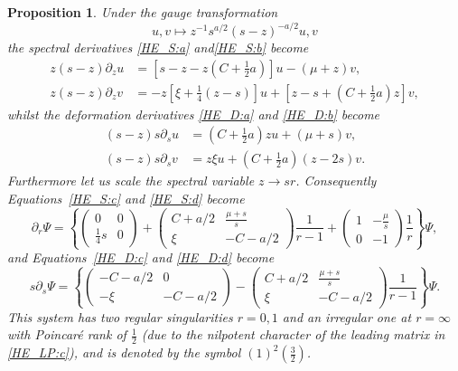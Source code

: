 \documentclass[10pt,reqno]{amsart}
\theoremstyle{plain}
\newtheorem{proposition}{Proposition}
\theoremstyle{definition}
\theoremstyle{remark}
\begin{document}
\begin{proposition}   
Under the gauge transformation
\begin{equation}
  u, v \mapsto z^{-1}s^{a/2}(s-z)^{-a/2} u, v
\label{gaugeFxm}
\end{equation}
the spectral derivatives \eqref{HE_S:a} and\eqref{HE_S:b} become
\begin{align}
  z(s-z)\partial_{z}u & = \left[s-z-z(C+\tfrac{1}{2}a)\right] u-(\mu+z) v,
\label{HE_S:c}\\
  z(s-z)\partial_{z}v & = -z\left[\xi +\tfrac{1}{4}(z-s)\right] u+\left[z-s+(C+\tfrac{1}{2}a)z\right] v,
\label{HE_S:d}
\end{align}
whilst the deformation derivatives \eqref{HE_D:a} and \eqref{HE_D:b} become
\begin{align}
  (s-z)s\partial_su & =  (C+\tfrac{1}{2}a)z u+(\mu+s) v ,
\label{HE_D:c} \\
  (s-z)s\partial_sv & = z\xi u+(C+\tfrac{1}{2}a)(z-2s)v .
\label{HE_D:d}
\end{align}
Furthermore let us scale the spectral variable $ z \to sr $.
Consequently Equations~\eqref{HE_S:c} and \eqref{HE_S:d} become
\begin{equation}
  \partial_r \Psi = 
  \left\{  \begin{pmatrix} 0 & 0 \\ \frac{1}{4}s & 0 \end{pmatrix} 
          +\begin{pmatrix} C+a/2 & \frac{\displaystyle\mu+s}{\displaystyle s} \\ \xi & -C-a/2 \end{pmatrix}\frac{1}{r-1}
          +\begin{pmatrix} 1 & -\frac{\displaystyle\mu}{\displaystyle s} \\ 0 & -1 \end{pmatrix}\frac{1}{r}
  \right\} \Psi ,
\label{HE_LP:c}
\end{equation}
and Equations~\eqref{HE_D:c} and \eqref{HE_D:d} become
\begin{equation}
  s\partial_s \Psi = 
  \left\{  \begin{pmatrix} -C-a/2 & 0 \\ -\xi & -C-a/2 \end{pmatrix}
          -\begin{pmatrix} C+a/2 & \frac{\displaystyle\mu+s}{\displaystyle s} \\ \xi & -C-a/2 \end{pmatrix}\frac{1}{r-1}
  \right\} \Psi .
\label{HE_LP:d}
\end{equation}
This system has two regular singularities $ r=0,1 $ and an irregular one at $ r=\infty $ with Poincar\'e 
rank of $ \tfrac{1}{2} $ (due to the nilpotent character of the leading matrix in \ref{HE_LP:c}), 
and is denoted by the symbol $ (1)^2(\tfrac{3}{2}) $.
\end{proposition}
\end{document}

